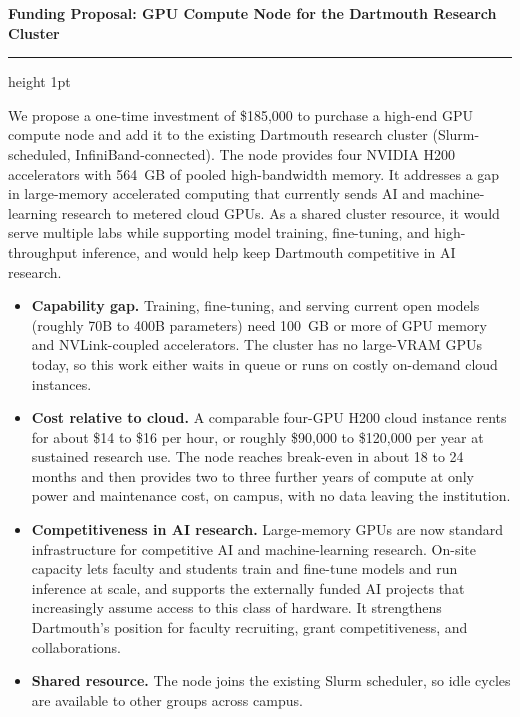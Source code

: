 \documentclass[10pt]{article}
\newcommand{\heading}[1]{\vspace{4pt}\noindent{\large\bfseries #1}\par\vspace{1pt}}
\begin{document}
{\LARGE\bfseries Funding Proposal: GPU Compute Node for the Dartmouth Research Cluster\par}
\vspace{3pt}
{\color{black}\hrule height 1pt}
\vspace{2pt}

\heading{Summary}
We propose a one-time investment of \$185{,}000 to purchase a high-end GPU compute node and add
it to the existing Dartmouth research cluster (Slurm-scheduled, InfiniBand-connected). The node
provides four NVIDIA H200 accelerators with 564~GB of pooled high-bandwidth memory. It addresses
a gap in large-memory accelerated computing that currently sends AI and machine-learning research
to metered cloud GPUs. As a shared cluster resource, it would serve multiple labs while supporting
model training, fine-tuning, and high-throughput inference, and would help keep Dartmouth
competitive in AI research.

\heading{Justification}
\begin{itemize}
  \setlength{\itemsep}{2pt}\setlength{\parsep}{0pt}\setlength{\topsep}{2pt}
  \item \textbf{Capability gap.} Training, fine-tuning, and serving current open models (roughly
    70B to 400B parameters) need 100~GB or more of GPU memory and NVLink-coupled accelerators. The
    cluster has no large-VRAM GPUs today, so this work either waits in queue or runs on costly
    on-demand cloud instances.
  \item \textbf{Cost relative to cloud.} A comparable four-GPU H200 cloud instance rents for about
    \$14 to \$16 per hour, or roughly \$90{,}000 to \$120{,}000 per year at sustained research use.
    The node reaches break-even in about 18 to 24 months and then provides two to three further
    years of compute at only power and maintenance cost, on campus, with no data leaving the
    institution.
  \item \textbf{Competitiveness in AI research.} Large-memory GPUs are now standard infrastructure
    for competitive AI and machine-learning research. On-site capacity lets faculty and students
    train and fine-tune models and run inference at scale, and supports the externally funded AI
    projects that increasingly assume access to this class of hardware. It strengthens Dartmouth's
    position for faculty recruiting, grant competitiveness, and collaborations.
  \item \textbf{Shared resource.} The node joins the existing Slurm scheduler, so idle cycles are
    available to other groups across campus.
\end{itemize}
\end{document}
